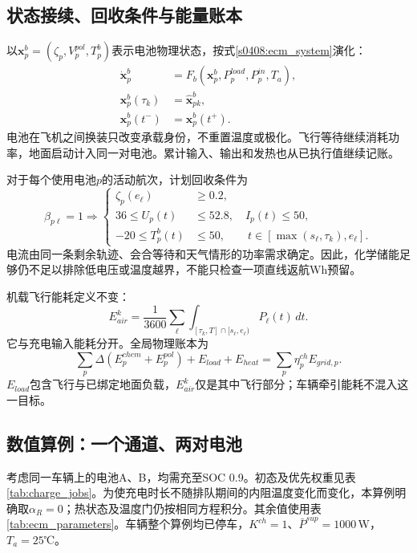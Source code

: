 \subsection{状态接续、回收条件与能量账本}

以$\mathbf x_p^b=(\zeta_p,V_p^{pol},T_p^b)$表示电池物理状态，按式\eqref{s0408:ecm_system}演化：
\begin{align}
 \dot{\mathbf x}_p^b&=F_b(\mathbf x_p^b,P_p^{load},P_p^{in},T_a),
 \label{s0505:energy_dynamics}\\
 \mathbf x_p^b(\tau_k)&=\widehat{\mathbf x}_{pk}^b,
 \label{s0505:energy_initial}\\
 \mathbf x_p^b(t^-)&=\mathbf x_p^b(t^+).
 \label{s0505:no_energy_reset}
\end{align}
电池在飞机之间换装只改变承载身份，不重置温度或极化。飞行等待继续消耗功率，地面启动计入同一对电池。累计输入、输出和发热也从已执行值继续记账。

对于每个使用电池$p$的活动航次，计划回收条件为
\begin{equation}
 \beta_{p\ell}=1\Rightarrow
 \left\{\begin{aligned}
 \zeta_p(e_\ell)&\ge0.2,\\
 36\le U_p(t)&\le52.8,\quad I_p(t)\le50,\\
 -20\le T_p^b(t)&\le50,\qquad t\in[\max(s_\ell,\tau_k),e_\ell].
 \end{aligned}\right.
 \label{s0505:recovery_energy}
\end{equation}
电流由同一条剩余轨迹、会合等待和天气情形的功率需求确定。因此，化学储能足够仍不足以排除低电压或温度越界，不能只检查一项直线返航Wh预留。

机载飞行能耗定义不变：
\begin{equation}
 E_{air}^k=\frac1{3600}\sum_\ell\int_{[\tau_k,T]\cap[s_\ell,e_\ell)}P_\ell(t)\,dt.
 \label{s0505:air_energy_total}
\end{equation}
它与充电输入能耗分开。全局物理账本为
\begin{equation}
 \sum_p\Delta(E_p^{chem}+E_p^{pol})+E_{load}+E_{heat}
 =\sum_p\eta_p^{ch}E_{grid,p}.
 \label{s0505:global_ledger}
\end{equation}
$E_{load}$包含飞行与已绑定地面负载，$E_{air}^k$仅是其中飞行部分；车辆牵引能耗不混入这一目标。

\subsection{数值算例：一个通道、两对电池}

考虑同一车辆上的电池A、B，均需充至SOC 0.9。初态及优先权重见表\ref{tab:charge_jobs}。为使充电时长不随排队期间的内阻温度变化而变化，本算例明确取$\alpha_R=0$；热状态及温度门仍按相同方程积分。其余值使用表\ref{tab:ecm_parameters}。车辆整个算例均已停车，$K^{ch}=1$、$\bar P^{sup}=1000$\,W，$T_a=25$℃。

